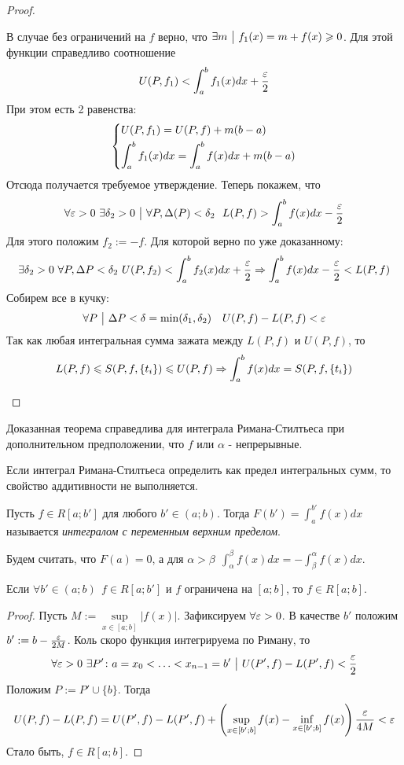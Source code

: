 \begin{proof}
\begin{itemize}
	В случае без ограничений на $f$ верно, что $\exists m \ \big|\  f_1(x) = m + f(x) \geqslant 0$. Для этой функции справедливо соотношение
	\[
		U(P, f_1) < \int_a^bf_1(x)dx + \frac{\varepsilon}{2}
	\]
	При этом есть 2 равенства:
	\[
		\left\{\begin{aligned}
			&{U(P, f_1) = U(P, f) + m(b - a)}
			\\
			&{\int_a^b f_1(x)dx = \int_a^b f(x)dx + m(b - a)}
		\end{aligned}\right.
	\]
	Отсюда получается требуемое утверждение. Теперь покажем, что
		\[
			\forall \varepsilon > 0\ \exists \delta_2 > 0 \ \big|\  \forall P, \Delta(P) < \delta_2\ \ L(P, f) >  \int_a^b f(x)dx - \frac{\varepsilon}{2}
		\]
		Для этого положим $f_2 := -f$. Для которой верно по уже доказанному:
		\[
			\exists \delta_2 > 0\ \forall P, \Delta P < \delta_2\ U(P, f_2) < \int_a^bf_2(x)dx + \frac{\varepsilon}{2} \Rightarrow \int_a^bf(x)dx - \frac{\varepsilon}{2} < L(P, f)
		\]
		Собирем все в кучку:
		\[
			\forall P \ \big|\  \Delta P < \delta = \min(\delta_1, \delta_2) \quad U(P, f) - L(P, f) < \varepsilon
		\]
		Так как любая интегральная сумма зажата между $L(P, f)$ и $U(P, f)$, то
		\[
			L(P, f) \leqslant  S(P, f, \{t_i\}) \leqslant U(P, f) \Rightarrow \int_a^bf(x)dx = S(P, f, \{t_i\})
		\]
	\end{itemize}
\end{proof}

\begin{note}
	Доказанная теорема справедлива для интеграла Римана-Стилтьеса при дополнительном предположении, что $f$ или $\alpha$ - непрерывные.
\end{note}

\begin{note}
	Если интеграл Римана-Стилтьеса определить как предел интегральных сумм, то свойство аддитивности не выполняется.
\end{note}

\begin{definition}
	Пусть $f \in R[a; b']$ для любого $b' \in (a; b)$. Тогда $F(b') = \int_a^{b'} f(x)dx$ называется \textit{интегралом с переменным верхним пределом}.
	
	Будем считать, что $F(a) = 0$, а для $\alpha > \beta\ \ \int_\alpha^\beta f(x)dx = -\int_\beta^\alpha f(x)dx$. 
\end{definition}

\begin{theorem}
	Если $\forall b' \in (a; b)\ \ f \in R[a; b']$ и $f$ ограничена на $[a; b]$, то $f \in R[a; b]$.
\end{theorem}

\begin{proof}
	Пусть $M := \sup\limits_{x \in [a; b]} |f(x)|$. Зафиксируем $\forall \varepsilon > 0$. В качестве $b'$ положим $b' := b - \frac{\varepsilon}{2M}$. Коль скоро функция интегрируема по Риману, то
	\[
		\forall \varepsilon > 0\ \exists P' \colon a = x_0 < \ldots < x_{n - 1} = b' \ \big|\  U(P', f) - L(P', f) < \frac{\varepsilon}{2}
	\]
	Положим $P := P' \cup \{b\}$. Тогда
	\[
		U(P, f) - L(P, f) = U(P', f) - L(P', f) + \left(\sup\limits_{x \in [b'; b]} f(x) - \inf\limits_{x \in [b'; b]} f(x)\right) \frac{\varepsilon}{4M} < \varepsilon
	\]
	Стало быть, $f \in R[a; b]$.
\end{proof}

